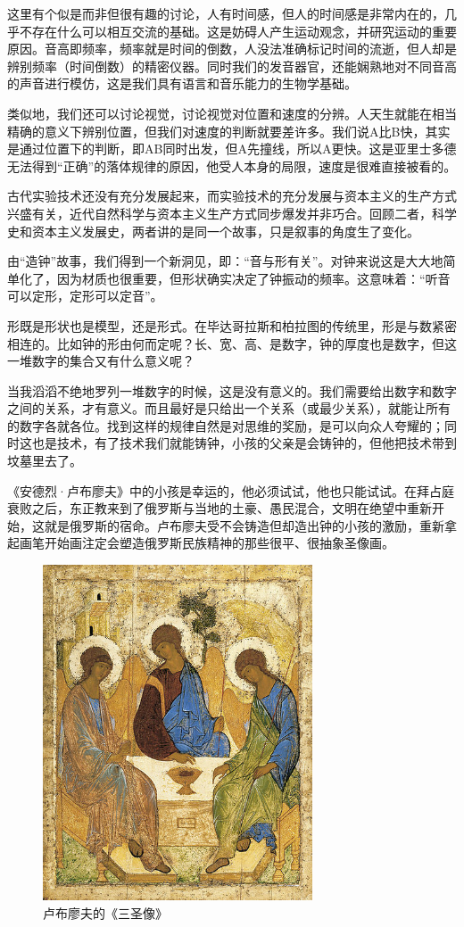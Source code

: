 这里有个似是而非但很有趣的讨论，人有时间感，但人的时间感是非常内在的，几乎不存在什么可以相互交流的基础。这是妨碍人产生运动观念，并研究运动的重要原因。音高即频率，频率就是时间的倒数，人没法准确标记时间的流逝，但人却是辨别频率（时间倒数）的精密仪器。同时我们的发音器官，还能娴熟地对不同音高的声音进行模仿，这是我们具有语言和音乐能力的生物学基础。

类似地，我们还可以讨论视觉，讨论视觉对位置和速度的分辨。人天生就能在相当精确的意义下辨别位置，但我们对速度的判断就要差许多。我们说A比B快，其实是通过位置下的判断，即AB同时出发，但A先撞线，所以A更快。这是亚里士多德无法得到“正确”的落体规律的原因，他受人本身的局限，速度是很难直接被看的。

古代实验技术还没有充分发展起来，而实验技术的充分发展与资本主义的生产方式兴盛有关，近代自然科学与资本主义生产方式同步爆发并非巧合。回顾二者，科学史和资本主义发展史，两者讲的是同一个故事，只是叙事的角度生了变化。

由“造钟”故事，我们得到一个新洞见，即：“音与形有关”。对钟来说这是大大地简单化了，因为材质也很重要，但形状确实决定了钟振动的频率。这意味着：“听音可以定形，定形可以定音”。

形既是形状也是模型，还是形式。在毕达哥拉斯和柏拉图的传统里，形是与数紧密相连的。比如钟的形由何而定呢？长、宽、高、是数字，钟的厚度也是数字，但这一堆数字的集合又有什么意义呢？

当我滔滔不绝地罗列一堆数字的时候，这是没有意义的。我们需要给出数字和数字之间的关系，才有意义。而且最好是只给出一个关系（或最少关系），就能让所有的数字各就各位。找到这样的规律自然是对思维的奖励，是可以向众人夸耀的；同时这也是技术，有了技术我们就能铸钟，小孩的父亲是会铸钟的，但他把技术带到坟墓里去了。

《安德烈·卢布廖夫》中的小孩是幸运的，他必须试试，他也只能试试。在拜占庭衰败之后，东正教来到了俄罗斯与当地的土豪、愚民混合，文明在绝望中重新开始，这就是俄罗斯的宿命。卢布廖夫受不会铸造但却造出钟的小孩的激励，重新拿起画笔开始画注定会塑造俄罗斯民族精神的那些很平、很抽象圣像画。

\begin{figure}[htbp]
\begin{center}
\includegraphics[width=8cm]{Preface/RublevTrinity.jpg}
\caption{卢布廖夫的《三圣像》}
\end{center}
\end{figure}

